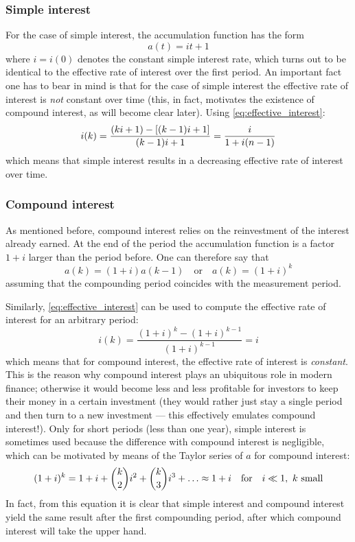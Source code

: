 \subsubsection{Simple interest}
For the case of simple interest, the accumulation function has the form
$$ a(t) = it + 1 $$ 
where $i = i(0)$ denotes the constant simple interest rate, which turns out to be identical to the effective rate of interest over the first period. An important fact one has to bear in mind is that for the case of simple interest the effective rate of interest is \emph{not} constant over time (this, in fact, motivates the existence of compound interest, as will become clear later). Using \cref{eq:effective_interest}:
$$ i(k) = \frac{\qty(ki + 1) - \qty[(k-1)i + 1]}{(k-1)i + 1} = \frac{i}{1 + i(n-1)}$$
which means that simple interest results in a decreasing effective rate of interest over time. \cite{Kellison1991}

\subsubsection{Compound interest}
As mentioned before, compound interest relies on the reinvestment of the interest already earned. At the end of the period the accumulation function is a factor $1 + i$ larger than the period before. One can therefore say that
$$a(k) = (1 + i)a(k-1)\quad\text{or}\quad a(k) = (1 + i)^{k}$$
assuming that the compounding period coincides with the measurement period. 

Similarly, \cref{eq:effective_interest} can be used to compute the effective rate of interest for an arbitrary period:
$$ i(k) = \frac{(1 + i)^k - (1 + i)^{k-1}}{(1 + i)^{k-1}} = i$$
which means that for compound interest, the effective rate of interest is \emph{constant}. This is the reason why compound interest plays an ubiquitous role in modern finance; otherwise it would become less and less profitable for investors to keep  their money in a certain investment (they would rather just stay a single period and then turn to a new investment --- this effectively emulates compound interest!). Only for short periods (less than one year), simple interest is sometimes used because the difference with compound interest is negligible, which can be motivated by means of the Taylor series of $a$ for compound interest: 
$$ (1 + i)^k = 1 + i +  \binom{k}{2}i^2 + \binom{k}{3}i^3 + \ldots \approx 1 + i\qfor i \ll 1,\ k \text{ small} $$
In fact, from this equation it is clear that simple interest and compound interest yield the same result after the first compounding period, after which compound interest will take the upper hand.

